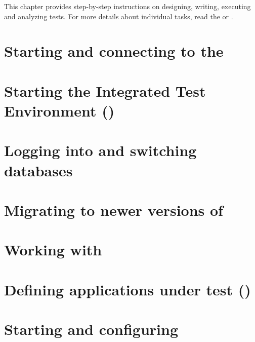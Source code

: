 %
This chapter provides step-by-step instructions on designing, writing, executing and analyzing tests. 
For more details about individual tasks, read the 
 or . 

\section{Starting and connecting to the \gdagent}


\section{Starting the Integrated Test Environment (\ite{})}


\section{Logging into and switching databases}


\section{Migrating to newer versions of \app{}}
\label{DBMigrate}


\clearpage

\section{Working with \gdprojects{}}
\label{WorkingWithProjects}


\clearpage
\section{Defining applications under test (\gdauts{})}
\label{Defineaut}


\section{Starting and configuring \gdauts{}}
\label{StartAUT}


